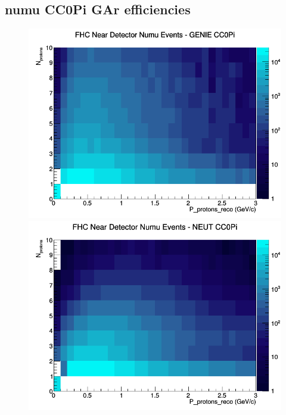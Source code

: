 \documentclass[12pt]{article}
\begin{document}
\subsection{numu CC0Pi GAr efficiencies}
\begin{figure}[h]
\includegraphics[width=\linewidth]{eff_N_P/GAr/protons/CC0Pi_FHC_ND_numu_N_P_GENIE.png}
\endminipage
{}
\includegraphics[width=\linewidth]{eff_N_P/GAr/protons/CC0Pi_FHC_ND_numu_N_P_NEUT.png}
\endminipage
{}

\end{figure}
\end{document}
